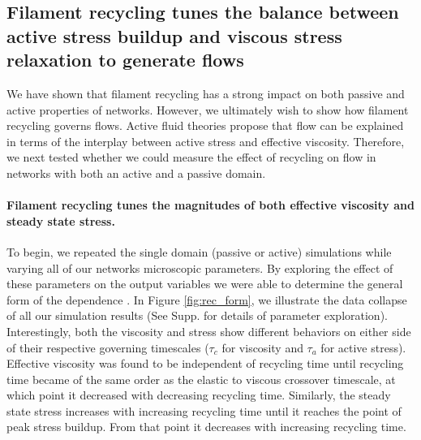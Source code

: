\documentclass[10pt,letterpaper]{article}
\begin{document}
\subsection*{Filament recycling tunes the balance between active stress buildup and viscous stress relaxation to generate flows}
We have shown that filament recycling has a strong impact on both passive and active properties of networks.  However, we ultimately wish to show how filament recycling governs flows. Active fluid theories propose that flow can be explained in terms of the interplay between active stress and effective viscosity. Therefore, we next tested whether we could measure the effect of recycling on flow in networks with both an active and a passive domain.
 

\paragraph{Filament recycling tunes the magnitudes of both effective viscosity and steady state stress.}  
To begin, we repeated the single domain (passive or active) simulations while varying all of our networks microscopic parameters.   By exploring the effect of these parameters on the output variables we were able to determine the general form of the dependence . In Figure  \ref{fig:rec_form}, we illustrate the data collapse of all our simulation results (See Supp. for details of parameter exploration).  Interestingly, both the viscosity and stress show different behaviors on either side of their respective governing timescales ($\tau_c$ for viscosity and $\tau_a$ for active stress).  Effective viscosity was found to be independent of recycling time until recycling time became of the same order as the elastic to viscous crossover timescale, at which point it decreased with decreasing recycling time.  Similarly, the steady state stress increases with increasing recycling time until it reaches the point of peak stress buildup.  From that point it decreases with increasing recycling time.
\end{document}
